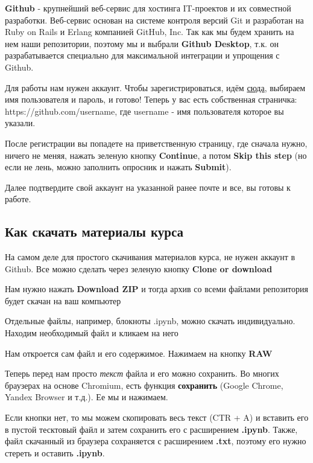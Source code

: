 \documentclass[11pt]{article}
\begin{document}
\textbf{Github} - крупнейший веб-сервис для хостинга IT-проектов и их
совместной разработки. Веб-сервис основан на системе контроля версий Git
и разработан на Ruby on Rails и Erlang компанией GitHub, Inc. Так как мы
будем хранить на нем наши репозитории, поэтому мы и выбрали
\textbf{Github Desktop}, т.к. он разрабатывается специально для
максимальной интеграции и упрощения с Github.

Для работы нам нужен аккаунт. Чтобы зарегистрироваться, идём
\href{https://github.com/join?source=header-home}{сюда}, выбираем имя
пользователя и пароль, и готово! Теперь у вас есть собственная
страничка: https://github.com/username, где username - имя пользователя
которое вы указали.

После регистрации вы попадете на приветственную страницу, где сначала
нужно, ничего не меняя, нажать зеленую кнопку \textbf{Continue}, а потом
\textbf{Skip this step} (но если не лень, можно заполнить опросник и
нажать \textbf{Submit}).

Далее подтвердите свой аккаунт на указанной ранее почте и все, вы готовы
к работе.

    \subsection{Как скачать материалы
курса}\label{ux43aux430ux43a-ux441ux43aux430ux447ux430ux442ux44c-ux43cux430ux442ux435ux440ux438ux430ux43bux44b-ux43aux443ux440ux441ux430}

На самом деле для простого скачивания материалов курса, не нужен аккаунт
в Github. Все можно сделать через зеленую кнопку \textbf{Clone or
download}

Нам нужно нажать \textbf{Download ZIP} и тогда архив со всеми файлами
репозитория будет скачан на ваш компьютер

Отдельные файлы, например, блокноты .ipynb, можно скачать индивидуально.
Находим необходимый файл и кликаем на него

Нам откроется сам файл и его содержимое. Нажимаем на кнопку \textbf{RAW}

Теперь перед нам просто \emph{текст} файла и его можно сохранить. Во
многих браузерах на основе Chromium, есть функция \textbf{сохранить}
(Google Chrome, Yandex Browser и т.д.). Ее мы и нажимаем.

Если кнопки нет, то мы можем скопировать весь текст (CTR + A) и вставить
его в пустой тесктовый файл и затем сохранить его с расширением
\textbf{.ipynb}. Также, файл скачанный из браузера сохраняется с
расширением \textbf{.txt}, поэтому его нужно стереть и оставить
\textbf{.ipynb}.
\end{document}
